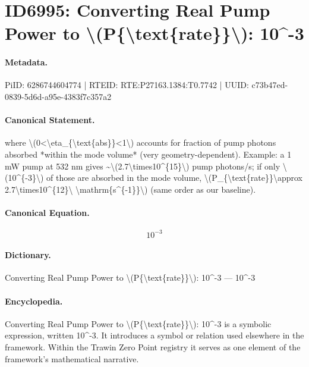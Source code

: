 \section*{ID6995: Converting Real Pump Power to \textbackslash{}(P\{\textbackslash{}text\{rate\}\}\textbackslash{}): 10\textasciicircum{}-3}
\paragraph{Metadata.}
PiID: 6286744604774 | RTEID: RTE:P27163.1384:T0.7742 | UUID: c73b47ed-0839-5d6d-a95e-4383f7c357a2

\paragraph{Canonical Statement.}
where \textbackslash{}(0<\textbackslash{}eta\_\{\textbackslash{}text\{abs\}\}<1\textbackslash{}) accounts for fraction of pump photons absorbed *within the mode volume* (very geometry-dependent). Example: a 1 mW pump at 532 nm gives \textasciitilde{}\textbackslash{}(2.7\textbackslash{}times10\textasciicircum{}\{15\}\textbackslash{}) pump photons/s; if only \textbackslash{}(10\textasciicircum{}\{-3\}\textbackslash{}) of those are absorbed in the mode volume, \textbackslash{}(P\_\{\textbackslash{}text\{rate\}\}\textbackslash{}approx 2.7\textbackslash{}times10\textasciicircum{}\{12\}\textbackslash{} \textbackslash{}mathrm\{s\textasciicircum{}\{-1\}\}\textbackslash{}) (same order as our baseline).

\paragraph{Canonical Equation.}
\[
10^{-3}
\]

\paragraph{Dictionary.}
Converting Real Pump Power to \textbackslash{}(P\{\textbackslash{}text\{rate\}\}\textbackslash{}): 10\textasciicircum{}-3 — 10\textasciicircum{}-3

\paragraph{Encyclopedia.}
Converting Real Pump Power to \textbackslash{}(P\{\textbackslash{}text\{rate\}\}\textbackslash{}): 10\textasciicircum{}-3 is a symbolic expression, written 10\textasciicircum{}-3. It introduces a symbol or relation used elsewhere in the framework. Within the Trawin Zero Point registry it serves as one element of the framework's mathematical narrative.

